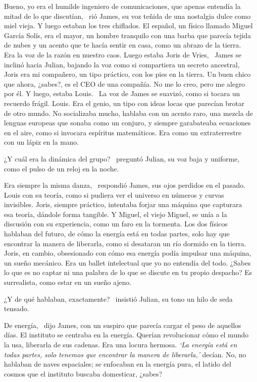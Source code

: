 \glqq Bueno, yo era el humilde ingeniero de comunicaciones, que apenas entendía la mitad de lo que discutían,\grqq~ rió James, su voz teñida de una nostalgia dulce como miel vieja. \glqq Y luego estaban los tres chiflados. El español, un físico llamado Miguel García Solís, era el mayor, un hombre tranquilo con una barba que parecía tejida de nubes y un acento que te hacía sentir en casa, como un abrazo de la tierra. Era la voz de la razón en nuestro caos. Luego estaba Joris de Vries,\grqq~ James se inclinó hacia Julian, bajando la voz como si compartiera un secreto ancestral, \glqq Joris era mi compañero, un tipo práctico, con los pies en la tierra. Un buen chico que ahora, ¿sabes?, es el CEO de una compañía. No me lo creo, pero me alegro por él. Y luego, estaba Louis.\grqq~ La voz de James se suavizó, como si tocara un recuerdo frágil. \glqq Louis. Era el genio, un tipo con ideas locas que parecían brotar de otro mundo. No socializaba mucho, hablaba con un acento raro, una mezcla de lenguas europeas que sonaba como un conjuro, y siempre garabateaba ecuaciones en el aire, como si invocara espíritus matemáticos. Era como un extraterrestre con un lápiz en la mano.\grqq

\glqq ¿Y cuál era la dinámica del grupo?\grqq~ preguntó Julian, su voz baja y uniforme, como el pulso de un reloj en la noche.

\glqq Era siempre la misma danza,\grqq~ respondió James, sus ojos perdidos en el pasado. \glqq Louis con su teoría, como si pudiera ver el universo en números y curvas invisibles. Joris, siempre práctico, intentaba forjar una máquina que capturara esa teoría, dándole forma tangible. Y Miguel, el viejo Miguel, se unía a la discusión con su experiencia, como un faro en la tormenta. Los dos físicos hablaban del futuro, de cómo la energía está en todas partes, solo hay que encontrar la manera de liberarla, como si desataran un río dormido en la tierra. Joris, en cambio, obsesionado con cómo esa energía podía impulsar una máquina, un sueño mecánico. Era un ballet intelectual que yo no entendía del todo. ¿Sabes lo que es no captar ni una palabra de lo que se discute en tu propio despacho? Es surrealista, como estar en un sueño ajeno.\grqq

\glqq ¿Y de qué hablaban, exactamente?\grqq~ insistió Julian, su tono un hilo de seda tensado.

\glqq De energía,\grqq~ dijo James, con un suspiro que parecía cargar el peso de aquellos días. \glqq El instituto se centraba en la energía. Querían revolucionar cómo el mundo la usa, liberarla de sus cadenas. Era una locura hermosa. \emph{`La energía está en todas partes, solo tenemos que encontrar la manera de liberarla,'} decían. No, no hablaban de naves espaciales; se enfocaban en la energía pura, el latido del cosmos que el instituto buscaba domesticar, ¿sabes?\grqq

